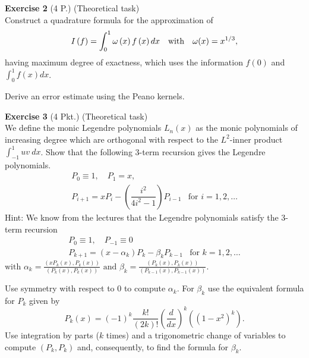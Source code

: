\documentclass[11pt,a4paper,german]{scrartcl}
\theoremstyle{break}   %
\begin{document}
\textbf{Exercise 2} (4 P.) (Theoretical task) \\
Construct a quadrature formula for the approximation of
\[
I\left(  f\right)  =\int_{0}^{1}\omega\left(  x\right)  f\left(  x\right)
dx\quad\text{with\quad}\omega(x)=x^{1/3},
\]
having maximum degree of exactness, which uses the information $f(0)$ and $ \int_0^1 f(x)dx$.

Derive an error estimate using the Peano kernels.
\vspace{4ex}

\textbf{Exercise 3} (4 Pkt.) (Theoretical task)\\
We define the monic Legendre polynomials $L_n(x)$ as the monic polynomials of increasing degree which are orthogonal with respect to the $L^2$-inner product $\int_{-1}^1 uv~ dx$. Show that the following 3-term recursion gives the Legendre polynomials.
\begin{eqnarray}
P_0 \equiv 1,  \quad 
P_1 = x, \quad & \nonumber \\ 
P_{i+1}= xP_i - \left ( \dfrac{i^2}{4i^2-1} \right ) P_{i-1} & \mbox{for } i=1,2,\ldots \label{3term}
\end{eqnarray}
Hint: 
We know from the lectures that the Legendre polynomials satisfy the 3-term recursion
\begin{eqnarray}
P_0 \equiv 1,  \quad  P_{-1}\equiv 0 \quad & \nonumber \\ 
P_{k+1}= (x-\alpha_k) P_k - \beta_k P_{k-1} & \mbox{for } k=1,2,\ldots \label{3term_manu}
\end{eqnarray}
$\text{with }\alpha_k=\frac{\left(xP_k(x),P_k(x)\right)}{\left(P_k(x),P_k(x)\right)}  \text{ and }  \beta_k=\frac{\left(P_k(x),P_k(x)\right)}{\left(P_{k-1}(x),P_{k-1}(x)\right)} .$


Use symmetry with respect to 0 to compute $\alpha_k$. For \(\beta_k\) use the equivalent formula for \(P_k\) given by
\begin{equation}
P_{k}\left(  x\right)  =\left(  -1\right)  ^{k}\frac{k!}{\left(  2k\right)
!}\left(  \frac{d}{dx}\right)  ^{k}\left(  \left(  1-x^{2}\right)
^{k}\right)  .\label{RF}%
\end{equation}
Use integration by parts (\(k\) times) and a trigonometric change of variables to compute $(P_k,P_k)$ and, consequently, to find the formula for $\beta_k$.
\end{document}
